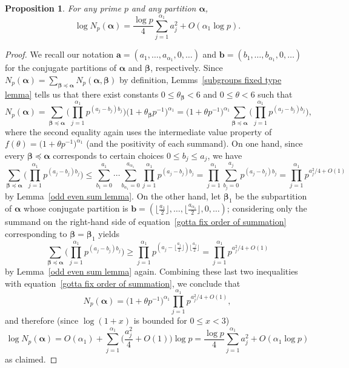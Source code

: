 \documentclass[12pt,reqno]{amsart}
\newtheorem{prop}[theorem]{Proposition}
\theoremstyle{definition}
\newcommand{\ba}{{\bm a}}
\newcommand{\bb}{{\bm b}}
\newcommand{\balpha}{{\bm\alpha}}
\newcommand{\bbeta}{{\bm\beta}}
\begin{document}
\begin{prop}
\label{log asymptotic p subgroups prop}
For any prime $p$ and any partition $\balpha$,
\[
\log N_p(\balpha) = \frac{\log p}4 \sum_{j=1}^{\alpha_1} a_j^2 + O(\alpha_1\log p).
\]
\end{prop}

\begin{proof}
We recall our notation $\ba = (a_1,\dots,a_{\alpha_1},0,\dots)$ and $\bb = (b_1,\dots,b_{\alpha_1},0,\dots)$ for the conjugate partitions of $\balpha$ and $\bbeta$, respectively.
Since $N_p(\balpha) = \sum_{\bbeta \preceq \balpha} N_p(\balpha,\bbeta)$ by definition, Lemms~\ref {subgroups fixed type lemma} tells us that there exist constants $0\le\theta_\bbeta<6$ and $0\le\theta<6$ such that
\begin{equation}  \label{gotta fix order of summation}
N_p(\balpha) = \sum_{\bbeta \preceq \balpha} \bigg( \prod_{j=1}^{\alpha_1} p^{(a_j-b_j)b_j} \bigg) \big( 1+\theta_\bbeta p^{-1} \big)^{\alpha_1}= \big( 1+\theta p^{-1} \big)^{\alpha_1} \sum_{\bbeta \preceq \balpha} \bigg( \prod_{j=1}^{\alpha_1} p^{(a_j-b_j)b_j} \bigg),
\end{equation}
where the second equality again uses the intermediate value property of $f(\theta) = \big( 1+\theta p^{-1} \big)^{\alpha_1}$ (and the positivity of each summand). On one hand, since every $\bbeta \preceq \balpha$ corresponds to certain choices $0\le b_j\le a_j$, we have
\[
\sum_{\bbeta \preceq \balpha} \bigg( \prod_{j=1}^{\alpha_1} p^{(a_j-b_j)b_j} \bigg) \le \sum_{b_1=0}^{a_1} \cdots \sum_{b_{\alpha_1}=0}^{a_{\alpha_1}} \prod_{j=1}^{\alpha_1} p^{(a_j-b_j)b_j} = \prod_{j=1}^{\alpha_1} \sum_{b_j=0}^{a_j} p^{(a_j-b_j)b_j} = \prod_{j=1}^{\alpha_1} p^{a_j^2/4+O(1)}
\]
by Lemma~\ref {odd even sum lemma}. On the other hand, let $\bbeta_1$ be the subpartition of $\balpha$ whose conjugate partition is $\bb = ( \lfloor \frac{a_1}2 \rfloor, \dots, \lfloor \frac{a_{\alpha_1}}2 \rfloor, 0,\dots )$; considering only the summand on the right-hand side of equation~\eqref{gotta fix order of summation} corresponding to $\bbeta=\bbeta_1$ yields
\[
\sum_{\bbeta \preceq \balpha} \bigg( \prod_{j=1}^{\alpha_1} p^{(a_j-b_j)b_j} \bigg) \ge \prod_{j=1}^{\alpha_1} p^{(a_j-\lfloor \frac{a_j}2 \rfloor)\lfloor \frac{a_j}2 \rfloor} = \prod_{j=1}^{\alpha_1} p^{a_j^2/4+O(1)}
\]
by Lemma~\ref {odd even sum lemma} again. Combining these last two inequalities with equation~\eqref{gotta fix order of summation}, we conclude that
\[
N_p(\balpha) = \big( 1+\theta p^{-1} \big)^{\alpha_1} \prod_{j=1}^{\alpha_1} p^{a_j^2/4+O(1)}, %
\]
and therefore (since $\log(1+x)$ is bounded for $0\le x<3$)
\[
\log N_p(\balpha) = O(\alpha_1) + \sum_{j=1}^{\alpha_1} \bigg( \frac{a_j^2}4 + O(1) \bigg) \log p = \frac{\log p}4 \sum_{j=1}^{\alpha_1} a_j^2 + O(\alpha_1\log p)
\]
as claimed.
\end{proof}
\end{document}
